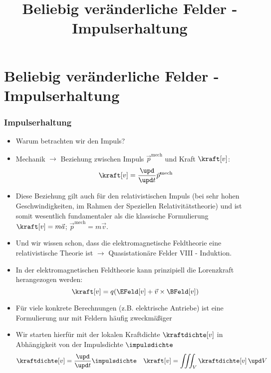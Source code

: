 
  
\title[TET: Beliebig veränderliche Felder - Impulserhaltung]{Beliebig veränderliche Felder - Impulserhaltung}


% 
% 

\maketitle

% 
% 
\section{Beliebig veränderliche Felder - Impulserhaltung}

\begin{frame}
  \frametitle{Impulserhaltung}
  \begin{itemize}[<+->]
  \item Warum betrachten wir den Impuls?
  \item Mechanik \(\to\) Beziehung zwischen \alert{Impuls} \(\vec{p}^\text{mech}\) und \alert{Kraft} \(\kraft[v]\):
    \begin{equation*}
      \kraft[v] = \frac{\upd}{\upd t} \vec{p}^\text{mech}
    \end{equation*}
  \item Diese Beziehung gilt auch für den \alert{relativistischen Impuls} (bei sehr hohen Geschwindigkeiten, im Rahmen der Speziellen Relativitätstheorie) und ist somit wesentlich fundamentaler als die klassische Formulierung \(\kraft[v] = m\vec{a}\); \(\vec{p}^\text{mech} = m \vec{v}\).
  \item Und wir wissen schon, dass die elektromagnetische Feldtheorie eine relativistische Theorie ist \(\to\) Quasistationäre Felder VIII - Induktion.
  \item In der elektromagnetischen Feldtheorie kann prinzipiell die \alert{Lorenzkraft} herangezogen werden:
    \begin{equation*}
      \kraft[v] = q (\EFeld[v] + \vec{v} \times \BFeld[v])
    \end{equation*}
  \item Für viele konkrete Berechnungen (z.B. elektrische Antriebe) ist eine \alert{Formulierung nur mit Feldern} häufig zweckmäßiger
  \item Wir starten hierfür mit der lokalen \alert{Kraftdichte} \(\kraftdichte[v]\) in Abhängigkeit von der \alert{Impulsdichte} \(\impulsdichte\)
    \begin{equation*}
      \kraftdichte[v] = \frac{\upd}{\upd t} \impulsdichte \quad \kraft[v]=\iiint_V \kraftdichte[v]\, \upd V
      \end{equation*}
  \end{itemize}
\end{frame}


